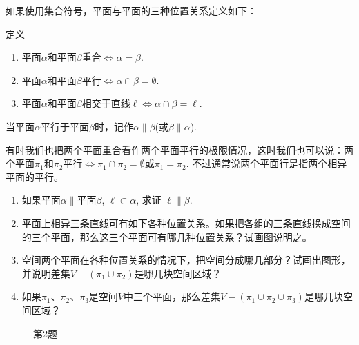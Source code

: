 如果使用集合符号，平面与平面的三种位置关系定义如下：

\begin{blk}{定义}
\begin{enumerate}
\item 平面$\alpha$和平面$\beta$重合$\Longleftrightarrow \alpha=\beta$.
\item 平面$\alpha$和平面$\beta$平行$\Longleftrightarrow \alpha\cap \beta=\emptyset$.
\item 平面$\alpha$和平面$\beta$相交于直线$\ell \Longleftrightarrow \alpha\cap \beta=\ell$.
\end{enumerate}
\end{blk}

当平面$\alpha$平行于平面$\beta$时，记作$\alpha\parallel \beta$(或$\beta\parallel \alpha$).

有时我们也把两个平面重合看作两个平面平行的极限情况，这时我们也可以说：两个平面$\pi_1$和$\pi_2$平行$\Longleftrightarrow \pi_1\cap \pi_2=\emptyset$或$\pi_1=\pi_2$. 不过通常说两个平面行是指两个相异平面的平行。

\begin{ex}
\begin{enumerate}
  \item 如果平面$\alpha\parallel$平面$\beta$, $\ell\subset \alpha$, 求证 $\ell\parallel \beta$.
  \item 平面上相异三条直线可有如下各种位置关系。如果把各组的三条直线换成空间的三个平面，那么这三个平面可有哪几种位置关系？试画图说明之。
  \item 空间两个平面在各种位置关系的情况下，把空间分成哪几部分？试画出图形，并说明差集$V-(\pi_1\cup \pi_2)$是哪几块空间区域？
  \item 如果$\pi_1$、$\pi_2$、$\pi_3$是空间$V$中三个平面，那么差集$V-(\pi_1\cup \pi_2\cup \pi_3)$是哪几块空间区域？
\end{enumerate}
\end{ex}

\begin{figure}[htp]
  \centering
{}
  \caption*{第2题}
\end{figure}

